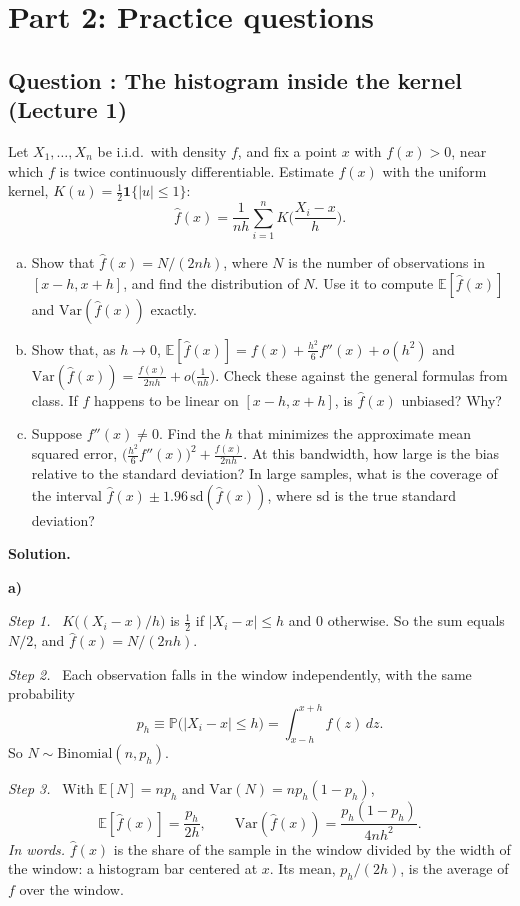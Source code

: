 \documentclass[11pt]{article}
\newcommand{\E}{\mathbb{E}}
\newcommand{\Var}{\mathrm{Var}}
\newcommand{\Prob}{\mathbb{P}}
\newcounter{question}
\newcommand{\question}[1]{
	\stepcounter{question}
	\subsection*{Question \thequestion: #1}
}
\newcommand{\itm}[1]{\par\needspace{4\baselineskip}\textbf{#1)}\ }
\newcommand{\solution}{\par\textcolor{FGVBlue}{\textbf{Solution.}}\par}
\newcommand{\step}[1]{\par\emph{Step #1.}\ }
\begin{document}
\section*{Part 2: Practice questions}

\question{The histogram inside the kernel (Lecture 1)}

Let $X_1,\dots,X_n$ be i.i.d.\ with density $f$, and fix a point $x$ with $f(x)>0$, near which $f$ is twice continuously differentiable. Estimate $f(x)$ with the uniform kernel, $K(u)=\frac12\mathbf 1\{|u|\le1\}$:
\[
\hat f(x)=\frac1{nh}\sum_{i=1}^nK\Big(\frac{X_i-x}h\Big).
\]
\begin{enumerate}[a)]
	\item Show that $\hat f(x)=N/(2nh)$, where $N$ is the number of observations in $[x-h,x+h]$, and find the distribution of $N$. Use it to compute $\E[\hat f(x)]$ and $\Var(\hat f(x))$ exactly.
	\item Show that, as $h\to0$, $\E[\hat f(x)]=f(x)+\frac{h^2}6f''(x)+o(h^2)$ and $\Var(\hat f(x))=\frac{f(x)}{2nh}+o\big(\frac1{nh}\big)$. Check these against the general formulas from class. If $f$ happens to be linear on $[x-h,x+h]$, is $\hat f(x)$ unbiased? Why?
	\item Suppose $f''(x)\neq0$. Find the $h$ that minimizes the approximate mean squared error, $\big(\frac{h^2}6f''(x)\big)^2+\frac{f(x)}{2nh}$. At this bandwidth, how large is the bias relative to the standard deviation? In large samples, what is the coverage of the interval $\hat f(x)\pm1.96\,\mathrm{sd}(\hat f(x))$, where $\mathrm{sd}$ is the true standard deviation?
\end{enumerate}

\solution
\itm{a}
\step{1} $K\big((X_i-x)/h\big)$ is $\frac12$ if $|X_i-x|\le h$ and $0$ otherwise. So the sum equals $N/2$, and $\hat f(x)=N/(2nh)$.

\step{2} Each observation falls in the window independently, with the same probability
\[
p_h\equiv\Prob\big(|X_i-x|\le h\big)=\int_{x-h}^{x+h}f(z)\,dz .
\]
So $N\sim\mathrm{Binomial}(n,p_h)$.

\step{3} With $\E[N]=np_h$ and $\Var(N)=np_h(1-p_h)$,
\[
\E[\hat f(x)]=\frac{p_h}{2h},\qquad\Var(\hat f(x))=\frac{p_h(1-p_h)}{4nh^2}.
\]
\emph{In words.} $\hat f(x)$ is the share of the sample in the window divided by the width of the window: a histogram bar centered at $x$. Its mean, $p_h/(2h)$, is the average of $f$ over the window.
\end{document}
